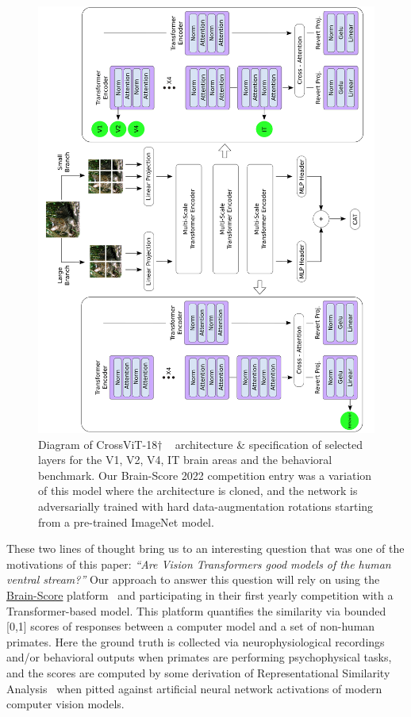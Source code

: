 \documentclass{article} %
\begin{document}
\begin{figure}[!t]
\centering
\includegraphics[scale=0.09,angle=-90]{src/crossvit_final_horizontal.pdf}
\caption{Diagram of CrossViT-18$\dagger$ ~\citep{chen2021crossvit} architecture \& specification of selected layers for the V1, V2, V4, IT brain areas and the behavioral benchmark. Our Brain-Score 2022 competition entry was a variation of this model where the architecture is cloned, and the network is adversarially trained with hard data-augmentation rotations starting from a pre-trained ImageNet model.}
\label{fig:CrossViT}
\end{figure}

These two lines of thought bring us to an interesting question that was one of the motivations of this paper: \textit{``Are Vision Transformers good models of the human ventral stream?''} Our approach to answer this question will rely on using the \href{https://www.brain-score.org/}{Brain-Score} platform~\citep{schrimpf2020brain} and participating in their first yearly competition with a Transformer-based model. This platform quantifies the similarity via bounded [0,1] scores of responses between a computer model and a set of non-human primates. Here the ground truth is collected via neurophysiological recordings and/or behavioral outputs when primates are performing psychophysical tasks, and the scores are computed by some derivation of Representational Similarity Analysis~\citep{kriegeskorte2008representational} when pitted against artificial neural network activations of modern computer vision models. 
\end{document}
